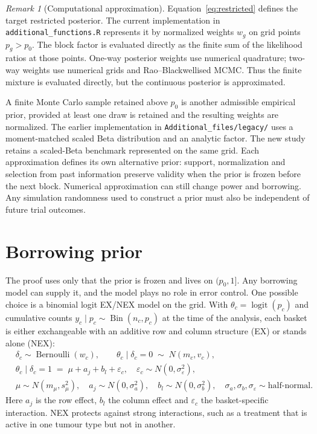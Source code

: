 \documentclass[11pt,a4paper]{article}
\theoremstyle{definition}
\theoremstyle{remark}
\newtheorem{remark}{Remark}
\DeclareMathOperator{\logit}{logit}
\DeclareMathOperator{\Bin}{Bin}
\DeclareMathOperator{\Bern}{Bernoulli}
\begin{document}
\begin{remark}[Computational approximation]
Equation~\ref{eq:restricted} defines the target restricted posterior.
The current implementation in \texttt{additional\_functions.R} represents it by normalized weights
$w_g$ on grid points $p_g>p_0$. The block factor is evaluated directly as the
finite sum of the likelihood ratios at those points. One-way posterior
weights use numerical quadrature; two-way weights use numerical grids and
Rao--Blackwellised MCMC. Thus the finite mixture is evaluated directly, but
the continuous posterior is approximated.

A finite Monte Carlo sample retained above $p_0$ is another admissible
empirical prior, provided at least one draw is retained and the resulting
weights are normalized. The earlier implementation in \texttt{Additional\_files/legacy/}
uses a moment-matched scaled Beta distribution and an analytic factor.
The new study retains a scaled-Beta benchmark represented on the same grid.
Each approximation defines its own alternative prior: support, normalization
and selection from past information preserve validity when the prior is
frozen before the next block. Numerical approximation can still change
power and borrowing. Any simulation randomness used to construct a prior
must also be independent of future trial outcomes.
\end{remark}

\section{Borrowing prior}\label{sec:model}

The proof uses only that the prior is frozen and lives on $(p_0,1]$.
Any borrowing model can supply it, and the model plays no role in error control.
One possible choice is a binomial logit EX/NEX model on the grid.
With $\theta_c = \logit(p_c)$ and cumulative counts $y_c \mid p_c \sim \Bin(n_c, p_c)$ at the time of the analysis, each basket is either exchangeable with an additive row and column structure (EX) or stands alone (NEX):
\begin{equation}\label{eq:exnex}
\begin{aligned}
  &\delta_c \sim \Bern(w_c), \qquad \theta_c \mid \delta_c = 0 \;\sim\; N(m_c, v_c), \\
  &\theta_c \mid \delta_c = 1 \;=\; \mu + a_j + b_l + \varepsilon_c, \quad \varepsilon_c \sim N(0, \sigma_\varepsilon^2), \\
  &\mu \sim N(m_\mu, s_\mu^2), \quad a_j \sim N(0, \sigma_a^2), \quad b_l \sim N(0, \sigma_b^2), \quad
  \sigma_a, \sigma_b, \sigma_\varepsilon \sim \text{half-normal}.
\end{aligned}
\end{equation}
Here $a_j$ is the row effect, $b_l$ the column effect and $\varepsilon_c$ the basket-specific interaction.
NEX protects against strong interactions, such as a treatment that is active in one tumour type but not in another.
\end{document}

